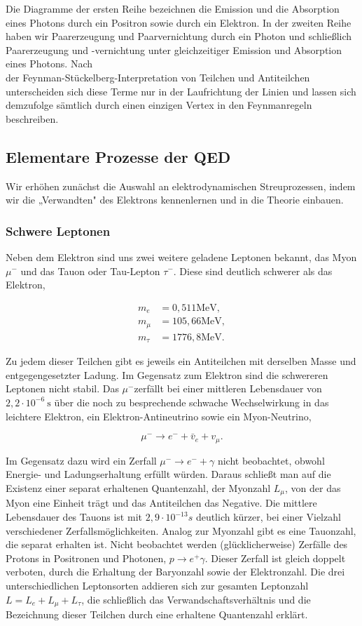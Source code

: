 \documentclass[10pt, letterpaper]{article}
\begin{document}
Die Diagramme der ersten Reihe bezeichnen die Emission und die Absorption eines Photons durch ein Positron sowie durch ein Elektron. In der zweiten Reihe haben wir Paarerzeugung und Paarvernichtung durch ein Photon und schließlich Paarerzeugung und -vernichtung unter gleichzeitiger Emission und Absorption eines Photons. Nach\\
der Feynman-Stückelberg-Interpretation von Teilchen und Antiteilchen unterscheiden sich diese Terme nur in der Laufrichtung der Linien und lassen sich demzufolge sämtlich durch einen einzigen Vertex in den Feynmanregeln beschreiben.

\subsection*{Elementare Prozesse der QED}
Wir erhöhen zunächst die Auswahl an elektrodynamischen Streuprozessen, indem wir die „Verwandten" des Elektrons kennenlernen und in die Theorie einbauen.

\subsubsection*{Schwere Leptonen}
Neben dem Elektron sind uns zwei weitere geladene Leptonen bekannt, das Myon $\mu^{-}$ und das Tauon oder Tau-Lepton $\tau^{-}$. Diese sind deutlich schwerer als das Elektron,

$$
\begin{aligned}
m_{e} & =0,511 \mathrm{MeV}, \\
m_{\mu} & =105,66 \mathrm{MeV}, \\
m_{\tau} & =1776,8 \mathrm{MeV} .
\end{aligned}
$$

Zu jedem dieser Teilchen gibt es jeweils ein Antiteilchen mit derselben Masse und entgegengesetzter Ladung. Im Gegensatz zum Elektron sind die schwereren Leptonen nicht stabil. Das $\mu^{-}$zerfällt bei einer mittleren Lebensdauer von $2,2 \cdot 10^{-6} \mathrm{~s}$ über die noch zu besprechende schwache Wechselwirkung in das leichtere Elektron, ein Elektron-Antineutrino sowie ein Myon-Neutrino,

$$
\mu^{-} \rightarrow e^{-}+\bar{v}_{e}+v_{\mu} .
$$

Im Gegensatz dazu wird ein Zerfall $\mu^{-} \rightarrow e^{-}+\gamma$ nicht beobachtet, obwohl Energie- und Ladungserhaltung erfüllt würden. Daraus schließt man auf die Existenz einer separat erhaltenen Quantenzahl, der Myonzahl $L_{\mu}$, von der das Myon eine Einheit trägt und das Antiteilchen das Negative. Die mittlere Lebensdauer des Tauons ist mit $2,9 \cdot 10^{-13} s$ deutlich kürzer, bei einer Vielzahl verschiedener Zerfallsmöglichkeiten. Analog zur Myonzahl gibt es eine Tauonzahl, die separat erhalten ist. Nicht beobachtet werden (glücklicherweise) Zerfälle des Protons in Positronen und Photonen, $p \rightarrow e^{+} \gamma$. Dieser Zerfall ist gleich doppelt verboten, durch die Erhaltung der Baryonzahl sowie der Elektronzahl. Die drei unterschiedlichen Leptonsorten addieren sich zur gesamten Leptonzahl $L=L_{e}+L_{\mu}+L_{\tau}$, die schließlich das Verwandschaftsverhältnis und die Bezeichnung dieser Teilchen durch eine erhaltene Quantenzahl erklärt.
\end{document}
